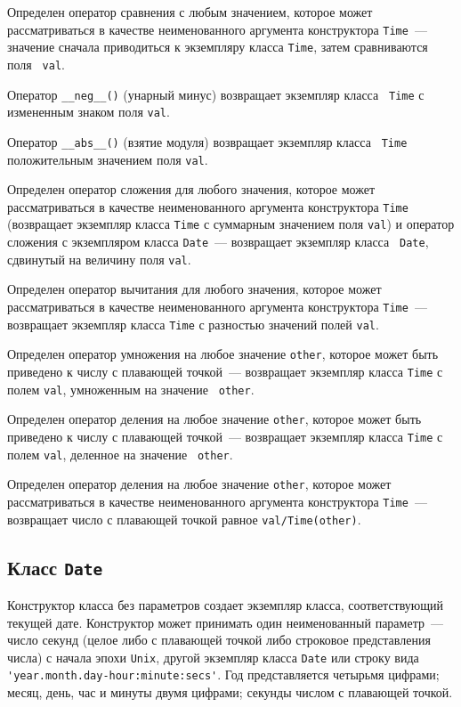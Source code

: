 Определен оператор сравнения с любым значением, которое может рассматриваться
в качестве неименованного аргумента конструктора {\tt Time}~--- значение сначала
приводиться к экземпляру класса {\tt Time}, затем сравниваются поля {\tt
  val}. 

Оператор {\tt \_\_neg\_\_()} (унарный минус) возвращает экземпляр класса {\tt
  Time} с измененным знаком поля {\tt val}.

Оператор {\tt \_\_abs\_\_()} (взятие модуля) возвращает экземпляр класса {\tt
  Time} положительным значением поля {\tt val}.

Определен оператор сложения для любого значения, которое может рассматриваться
в качестве неименованного аргумента конструктора {\tt Time} (возвращает
экземпляр класса {\tt Time} с суммарным значением поля {\tt val}) и оператор
сложения с экземпляром класса {\tt Date}~--- возвращает экземпляр класса {\tt
  Date}, сдвинутый на величину поля {\tt val}. 

Определен оператор вычитания для любого значения, которое может рассматриваться
в качестве неименованного аргумента конструктора {\tt Time}~--- возвращает
экземпляр класса {\tt Time} с разностью значений полей {\tt val}. 

Определен оператор умножения на любое значение {\tt other}, которое может быть приведено к
числу с плавающей точкой~--- возвращает
экземпляр класса {\tt Time} с полем {\tt val}, умноженным на значение {\tt
  other}.

Определен оператор деления на любое значение {\tt other}, которое может быть приведено к
числу с плавающей точкой~--- возвращает
экземпляр класса {\tt Time} с полем {\tt val}, деленное на значение {\tt
  other}.

Определен оператор деления на любое значение {\tt other}, 
которое может рассматриваться
в качестве неименованного аргумента конструктора {\tt Time}~---
возвращает число с плавающей точкой  равное {\tt val/Time(other)}.
\fi

\subsection{Класс {\tt Date}}
Конструктор класса без параметров создает экземпляр класса, соответствующий
текущей дате. Конструктор может принимать один неименованный параметр~--- число секунд (целое
либо с плавающей точкой либо строковое представления числа) с начала эпохи {\tt Unix}, другой экземпляр класса
{\tt Date} или строку вида
\verb|'year.month.day-hour:minute:secs'|. Год представляется четырьмя
цифрами; месяц, день, час и минуты двумя цифрами; секунды числом с плавающей точкой. 

